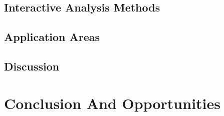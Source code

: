 \documentclass[a4paper,fleqn]{cas-dc}
\begin{document}
\subsection{Interactive Analysis Methods}

\subsection{Application Areas}

\subsection{Discussion}

\section{Conclusion And Opportunities}



\end{document}
